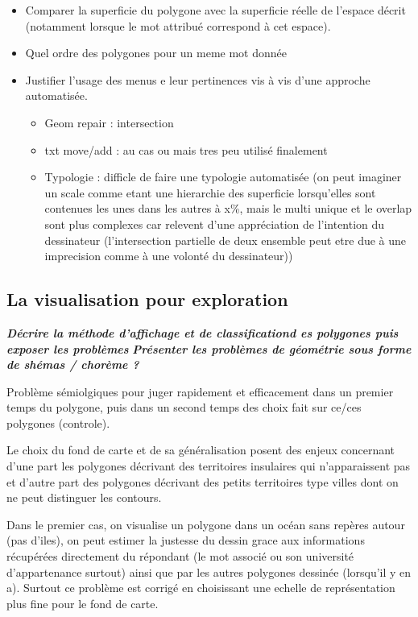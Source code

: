 \documentclass[
  a4paper,
]{scrbook}
\providecommand{\tightlist}{%
  \setlength{\itemsep}{0pt}\setlength{\parskip}{0pt}}\usepackage{longtable,booktabs,array}
\begin{document}
\begin{itemize}
\tightlist
\item
  Comparer la superficie du polygone avec la superficie réelle de
  l'espace décrit (notamment lorsque le mot attribué correspond à cet
  espace).
\item
  Quel ordre des polygones pour un meme mot donnée
\item
  Justifier l'usage des menus e leur pertinences vis à vis d'une
  approche automatisée.

  \begin{itemize}
  \tightlist
  \item
    Geom repair : intersection
  \item
    txt move/add : au cas ou mais tres peu utilisé finalement
  \item
    Typologie : difficle de faire une typologie automatisée (on peut
    imaginer un scale comme etant une hierarchie des superficie
    lorsqu'elles sont contenues les unes dans les autres à x\%, mais le
    multi unique et le overlap sont plus complexes car relevent d'une
    appréciation de l'intention du dessinateur (l'intersection partielle
    de deux ensemble peut etre due à une imprecision comme à une volonté
    du dessinateur))
  \end{itemize}
\end{itemize}

\hypertarget{la-visualisation-pour-exploration}{%
\subsection{La visualisation pour
exploration}\label{la-visualisation-pour-exploration}}

\textbf{\emph{Décrire la méthode d'affichage et de classificationd es
polygones puis exposer les problèmes}} \textbf{\emph{Présenter les
problèmes de géométrie sous forme de shémas / chorème ?}}

Problème sémiolgiques pour juger rapidement et efficacement dans un
premier temps du polygone, puis dans un second temps des choix fait sur
ce/ces polygones (controle).

Le choix du fond de carte et de sa généralisation posent des enjeux
concernant d'une part les polygones décrivant des territoires insulaires
qui n'apparaissent pas et d'autre part des polygones décrivant des
petits territoires type villes dont on ne peut distinguer les contours.

Dans le premier cas, on visualise un polygone dans un océan sans repères
autour (pas d'iles), on peut estimer la justesse du dessin grace aux
informations récupérées directement du répondant (le mot associé ou son
université d'appartenance surtout) ainsi que par les autres polygones
dessinée (lorsqu'il y en a). Surtout ce problème est corrigé en
choisissant une echelle de représentation plus fine pour le fond de
carte.
\end{document}

